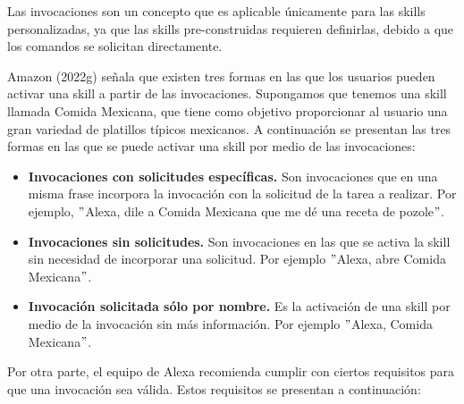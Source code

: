 Las invocaciones son un concepto que es aplicable únicamente para las skills personalizadas, ya que las skills pre-construidas requieren definirlas, debido a que los comandos se solicitan directamente.

Amazon (2022g) señala que existen tres formas en las que los usuarios pueden activar una skill a partir de las invocaciones. Supongamos que tenemos una skill llamada Comida Mexicana, que tiene como objetivo proporcionar al usuario una gran variedad de platillos típicos mexicanos. A continuación se presentan las tres formas en las que se puede activar una skill por medio de las invocaciones:

\begin{itemize}
  \item \textbf{Invocaciones con solicitudes específicas.} Son invocaciones que en una misma frase incorpora la invocación con la solicitud de la tarea a realizar. Por ejemplo, $"$Alexa, dile a Comida Mexicana que me dé una receta de pozole$"$.
  \item \textbf{Invocaciones sin solicitudes.} Son invocaciones en las que se activa la skill sin necesidad de incorporar una solicitud. Por ejemplo $"$Alexa, abre Comida Mexicana$"$.
  \item \textbf{Invocación solicitada sólo por nombre.} Es la activación de una skill por medio de la invocación sin más información. Por ejemplo $"$Alexa, Comida Mexicana$"$.
\end{itemize}

Por otra parte, el equipo de Alexa recomienda cumplir con ciertos requisitos para que una invocación sea válida. Estos requisitos se presentan a continuación:

